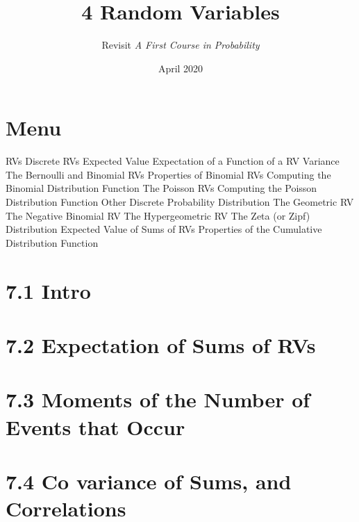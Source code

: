 \documentclass{article}
\title{4 Random Variables}
\author{Revisit \emph{A First Course in Probability}}
\date{April 2020}
\begin{document}
\maketitle

\section*{Menu}
\begin{outline}[enumerate]
    \1  RVs
    \1  Discrete RVs
    \1  Expected Value
    \1  Expectation of a Function of a RV
    \1  Variance
    \1  The Bernoulli and Binomial RVs
        \2 Properties of Binomial RVs
        \2 Computing the Binomial Distribution Function
    \1  The Poisson RVs 
        \2 Computing the Poisson Distribution Function
    \1  Other Discrete Probability Distribution
        \2 The Geometric RV
        \2 The Negative Binomial RV
        \2 The Hypergeometric RV
        \2 The Zeta (or Zipf) Distribution 
    \1  Expected Value of Sums of RVs
    \1  Properties of the Cumulative Distribution Function 
\end{outline}


\section*{7.1 Intro}
\section*{7.2 Expectation of Sums of RVs}
\section*{7.3 Moments of the Number of Events that Occur}
\section*{7.4 Co variance of Sums, and Correlations}





\end{document}
